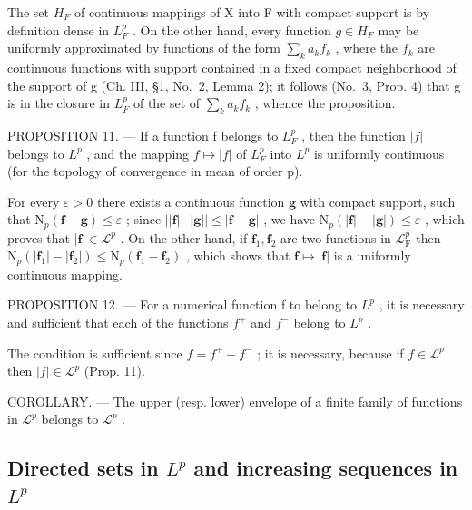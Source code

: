 The set \(H_{F}\) of continuous mappings of X into F with compact support is by definition dense in \(L_{F}^{p}\) . On the other hand, every function \(g \in H_{F}\) may be uniformly approximated by functions of the form \(\sum_{k} a_{k} f_{k}\) , where the \(f_{k}\) are continuous functions with support contained in a fixed compact neighborhood of the support of g (Ch. III, §1, No.~2, Lemma 2); it follows (No.~3, Prop. 4) that g is in the closure in \(L_{F}^{p}\) of the set of \(\sum_{k} a_{k} f_{k}\) , whence the proposition.

PROPOSITION 11. --- If a function f belongs to \(L_{F}^{p}\) , then the function \(|f|\) belongs to \(L^{p}\) , and the mapping \(f \mapsto |f|\) of \(L_{F}^{p}\) into \(L^{p}\) is uniformly continuous (for the topology of convergence in mean of order p).

For every \(\varepsilon > 0\) there exists a continuous function \(\mathbf{g}\) with compact support, such that \(\mathrm{N}_p(\mathbf{f} - \mathbf{g}) \leqslant \varepsilon\) ; since \(||\mathbf{f}| - |\mathbf{g}|| \leqslant |\mathbf{f} - \mathbf{g}|\) , we have \(\mathrm{N}_p(|\mathbf{f}| - |\mathbf{g}|) \leqslant \varepsilon\) , which proves that \(|\mathbf{f}| \in \mathcal{L}^p\) . On the other hand, if \(\mathbf{f}_1, \mathbf{f}_2\) are two functions in \(\mathcal{L}_{\mathrm{F}}^p\) then \(\mathrm{N}_p(|\mathbf{f}_1| - |\mathbf{f}_2|) \leqslant \mathrm{N}_p(\mathbf{f}_1 - \mathbf{f}_2)\) , which shows that \(\mathbf{f} \mapsto |\mathbf{f}|\) is a uniformly continuous mapping.

PROPOSITION 12. --- For a numerical function f to belong to \(L^{p}\) , it is necessary and sufficient that each of the functions \(f^{+}\) and \(f^{-}\) belong to \(L^{p}\) .

The condition is sufficient since \(f = f^{+} - f^{-}\) ; it is necessary, because if \(f \in \mathcal{L}^p\) then \(|f| \in \mathcal{L}^p\) (Prop. 11).

COROLLARY. --- The upper (resp. lower) envelope of a finite family of functions in \(\mathcal{L}^{p}\) belongs to \(\mathcal{L}^{p}\) .

\subsection{\texorpdfstring{Directed sets in \(L^{p}\) and increasing sequences in \(L^{p}\)}{Directed sets in L to the p and increasing sequences in L to the p}}

